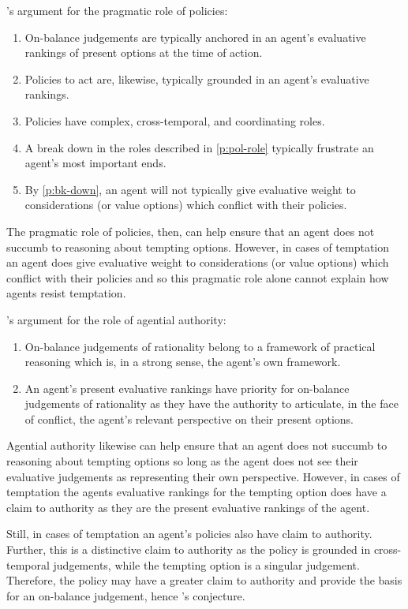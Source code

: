 \documentclass[10pt]{article}
\begin{document}
\citeauthor{Bratman:2007ab}'s argument for the pragmatic role of policies:

\begin{enumerate}
\item On-balance judgements are typically anchored in an agent's evaluative rankings of present options at the time of action.
\item Policies to act are, likewise, typically grounded in an agent's evaluative rankings.
\item\label{p:pol-role} Policies have complex, cross-temporal, and coordinating roles.
\item\label{p:bk-down} A break down in the roles described in \ref{p:pol-role} typically frustrate an agent's most important ends.
\item By \ref{p:bk-down}, an agent will not typically give evaluative weight to considerations (or value options) which conflict with their policies.
\end{enumerate}

The pragmatic role of policies, then, can help ensure that an agent does not succumb to reasoning about tempting options.
However, in cases of temptation an agent does give evaluative weight to considerations (or value options) which conflict with their policies and so this pragmatic role alone cannot explain how agents resist temptation.

\citeauthor{Bratman:2007ab}'s argument for the role of agential authority:

\begin{enumerate}
\item On-balance judgements of rationality belong to a framework of practical reasoning which is, in a strong sense, the agent's own framework.
\item An agent's present evaluative rankings have priority for on-balance judgements of rationality as they have the authority to articulate, in the face of conflict, the agent's relevant perspective on their present options.
\end{enumerate}

Agential authority likewise can help ensure that an agent does not succumb to reasoning about tempting options so long as the agent does not see their evaluative judgements as representing their own perspective.
However, in cases of temptation the agents evaluative rankings for the tempting option does have a claim to authority as they are the present evaluative rankings of the agent.

Still, in cases of temptation an agent's policies also have claim to authority.
Further, this is a distinctive claim to authority as the policy is grounded in cross-temporal judgements, while the tempting option is a singular judgement.
Therefore, the policy may have a greater claim to authority and provide the basis for an on-balance judgement, hence \citeauthor{Bratman:2007ab}'s conjecture.




\vfill
\nocite{Mackie:1965aa}
\printbibliography
\end{document}
